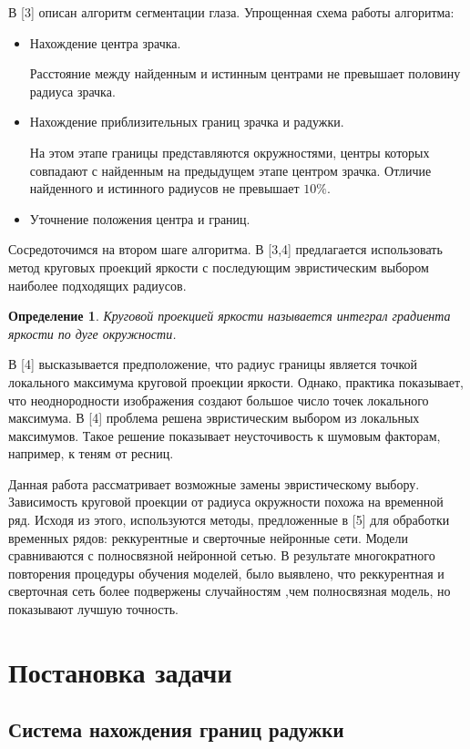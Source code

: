\documentclass[12pt, twoside]{article}
\newtheorem{definition}{Определение}
\begin{document}
В [3] описан алгоритм сегментации глаза. Упрощенная схема работы алгоритма:
\begin{itemize}
	\item Нахождение центра зрачка.
	
	 Расстояние между найденным и истинным центрами не превышает половину радиуса зрачка.
	\item Нахождение приблизительных границ зрачка и радужки.
	
	На этом этапе границы представляются окружностями, центры которых совпадают с найденным на предыдущем этапе центром зрачка. Отличие найденного и истинного радиусов не превышает $10\%$.
	
	\item Уточнение положения центра и границ.
\end{itemize}
Сосредоточимся на втором шаге алгоритма. В [3,4] предлагается использовать метод круговых проекций яркости с последующим эвристическим выбором наиболее подходящих радиусов.
\begin{definition}\label{def:proj}
\emph{Круговой проекцией яркости} называется интеграл градиента яркости по дуге окружности.
\end{definition}
В [4] высказывается предположение, что радиус границы является точкой локального максимума круговой проекции яркости. Однако, практика показывает, что неоднородности изображения создают большое число точек локального максимума. В [4] проблема решена эвристическим выбором из локальных максимумов. Такое решение показывает неусточивость к шумовым факторам, например, к теням от ресниц.

Данная работа рассматривает возможные замены эвристическому выбору. Зависимость круговой проекции от радиуса окружности похожа на временной ряд. Исходя из этого, используются методы, предложенные в [5] для обработки временных рядов: реккурентные и сверточные нейронные сети. Модели сравниваются с полносвязной нейронной сетью. В результате многократного повторения процедуры обучения моделей, было выявлено, что реккурентная и сверточная сеть более подвержены случайностям ,чем полносвязная модель, но показывают лучшую точность.

\section{Постановка задачи}
\subsection{Система нахождения границ радужки}
\end{document}
